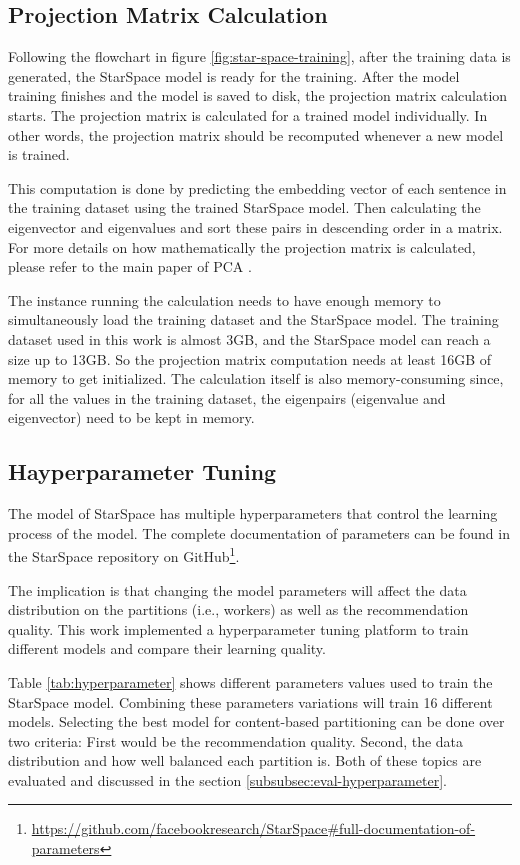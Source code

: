 \subsection{Projection Matrix Calculation}
\label{subsec:projection-matrix-calculation}
Following the flowchart in figure \ref{fig:star-space-training}, after the training data is generated, the StarSpace model is ready for the training. After the model training finishes and the model is saved to disk, the projection matrix calculation starts. The projection matrix is calculated for a trained model individually. In other words, the projection matrix should be recomputed whenever a new model is trained.


This computation is done by predicting the embedding vector of each sentence in the training dataset using the trained StarSpace model. Then calculating the eigenvector and eigenvalues and sort these pairs in descending order in a matrix. For more details on how mathematically the projection matrix is calculated, please refer to the main paper of PCA \cite{woldPrincipalComponentAnalysis}.


The instance running the calculation needs to have enough memory to simultaneously load the training dataset and the StarSpace model. The training dataset used in this work is almost 3GB, and the StarSpace model can reach a size up to 13GB. So the projection matrix computation needs at least 16GB of memory to get initialized. The calculation itself is also memory-consuming since, for all the values in the training dataset, the eigenpairs (eigenvalue and eigenvector) need to be kept in memory.


\subsection{Hayperparameter Tuning}
\label{subsec:hyperparameter-tuning}
The model of StarSpace has multiple hyperparameters that control the learning process of the model. The complete documentation of parameters can be found in the StarSpace repository on GitHub\footnote{\url{https://github.com/facebookresearch/StarSpace\#full-documentation-of-parameters}}. 


The implication is that changing the model parameters will affect the data distribution on the partitions (i.e., workers) as well as the recommendation quality. This work implemented a hyperparameter tuning platform to train different models and compare their learning quality.


Table \ref{tab:hyperparameter} shows different parameters values used to train the StarSpace model. Combining these parameters variations will train 16 different models. Selecting the best model for content-based partitioning can be done over two criteria: First would be the recommendation quality. Second, the data distribution and how well balanced each partition is. Both of these topics are evaluated and discussed in the section \ref{subsubsec:eval-hyperparameter}.


